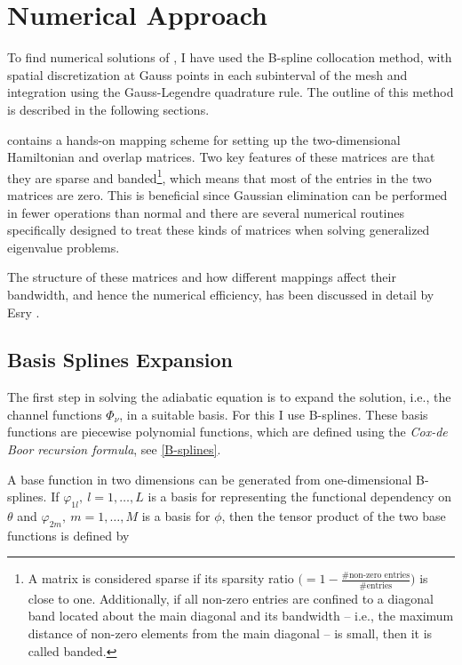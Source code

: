 \chapter{Numerical Approach}\label{chapter:5}
To find numerical solutions of , I have used the B-spline collocation method, with spatial discretization at Gauss points in each subinterval of the mesh and integration using the Gauss-Legendre quadrature rule. The outline of this method is described in the following sections. 

 contains a hands-on mapping scheme for setting up the two-dimensional Hamiltonian and overlap matrices. Two key features of these matrices are that they are sparse and banded\footnote{A matrix is considered sparse if its sparsity ratio $\big(=1 - \frac{\# \text{non-zero entries}}{\#\text{entries}}\big)$ is close to one. Additionally, if all non-zero entries are confined to a diagonal band located about the main diagonal and its bandwidth -- i.e., the maximum distance of non-zero elements from the main diagonal -- is small, then it is called banded.}, which means that most of the entries in the two matrices are zero. This is beneficial since Gaussian elimination can be performed in fewer operations than normal and there are several numerical routines specifically designed to treat these kinds of matrices when solving generalized eigenvalue problems. 

The structure of these matrices and how different mappings affect their bandwidth, and hence the numerical efficiency, has been discussed in detail by Esry \cite{Esry_thesis}.   

\section{Basis Splines Expansion}\label{section:BSexpansion}
The first step in solving the adiabatic equation is to expand the solution, i.e., the channel functions $\Phi_{\nu}$, in a suitable basis. For this I use B-splines. These basis functions are piecewise polynomial functions, which are defined using the \emph{Cox-de Boor recursion formula}, see \cref{B-splines}. 

A base function in two dimensions can be generated from one-dimensional B-splines. If $\varphi_{1l}, \ l= 1,\ldots,L$ is a basis for representing the functional dependency on $\theta$ and $\varphi_{2m}, \ m= 1,\ldots,M$ is a basis for $\phi$, then the tensor product of the two base functions is defined by

